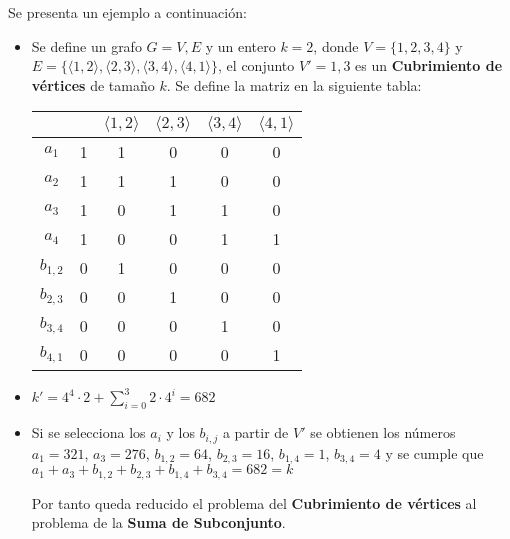 \documentclass{article}
\begin{document}
Se presenta un ejemplo a continuación:
\begin{itemize}
    \item Se define un grafo $G=V,E$ y un entero $k=2$, donde $V=\{1,2,3,4\}$ y $E=\{\langle 1, 2 \rangle ,\langle 2, 3 \rangle ,\langle 3, 4 \rangle ,\langle 4, 1 \rangle\}$,
          el conjunto $V'={1,3}$ es un \textbf{Cubrimiento de vértices} de tamaño $k$. Se define la matriz en la siguiente tabla:

          \begin{table}[h]
              \centering
              \begin{tabular}{|c|c|c|c|c|c|}
                  \hline
                            &   & $\langle 1, 2 \rangle$ & $\langle 2, 3 \rangle$ & $\langle 3, 4 \rangle$ & $\langle 4, 1 \rangle$ \\ \hline
                  $a_1$     & 1 & 1                      & 0                      & 0                      & 0                      \\ \hline
                  $a_2$     & 1 & 1                      & 1                      & 0                      & 0                      \\ \hline
                  $a_3$     & 1 & 0                      & 1                      & 1                      & 0                      \\ \hline
                  $a_4$     & 1 & 0                      & 0                      & 1                      & 1                      \\ \hline
                  $b_{1,2}$ & 0 & 1                      & 0                      & 0                      & 0                      \\ \hline
                  $b_{2,3}$ & 0 & 0                      & 1                      & 0                      & 0                      \\ \hline
                  $b_{3,4}$ & 0 & 0                      & 0                      & 1                      & 0                      \\ \hline
                  $b_{4,1}$ & 0 & 0                      & 0                      & 0                      & 1                      \\ \hline
              \end{tabular}
          \end{table}

    \item $k'=4^{4}\cdot 2+\sum_{i=0}^{3}2\cdot 4^i=682$
    \item Si se selecciona los $a_i$ y los $b_{i,j}$ a partir de $V'$ se obtienen los números $a_1=321$, $a_3=276$, $b_{1,2}=64$, $b_{2,3}=16$, $b_{1,4}=1$, $b_{3,4}=4$
          y se cumple que  $a_1+a_3+b_{1,2}+b_{2,3}+b_{1,4}+b_{3,4}=682=k$

          Por tanto queda reducido el problema del \textbf{Cubrimiento de vértices} al problema de la \textbf{Suma de Subconjunto}.

\end{itemize}
\end{document}

